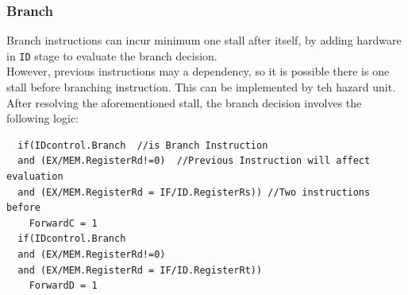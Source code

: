\documentclass[12pt]{article}
\theoremstyle{definition}
\begin{document}
\subsubsection{Branch}
Branch instructions can incur minimum one stall after itself, by adding hardware in \texttt{ID} stage to evaluate the branch decision.\\
However, previous instructions may a dependency, so it is possible there is one stall before branching instruction. This can be implemented by teh hazard unit.\\
After resolving the aforementioned stall, the branch decision involves the following logic:
\begin{verbatim}
  if(IDcontrol.Branch  //is Branch Instruction
  and (EX/MEM.RegisterRd!=0)  //Previous Instruction will affect evaluation
  and (EX/MEM.RegisterRd = IF/ID.RegisterRs)) //Two instructions before
    ForwardC = 1  
  if(IDcontrol.Branch  
  and (EX/MEM.RegisterRd!=0)  
  and (EX/MEM.RegisterRd = IF/ID.RegisterRt)) 
    ForwardD = 1  
\end{verbatim}










\clearpage

\end{document}

